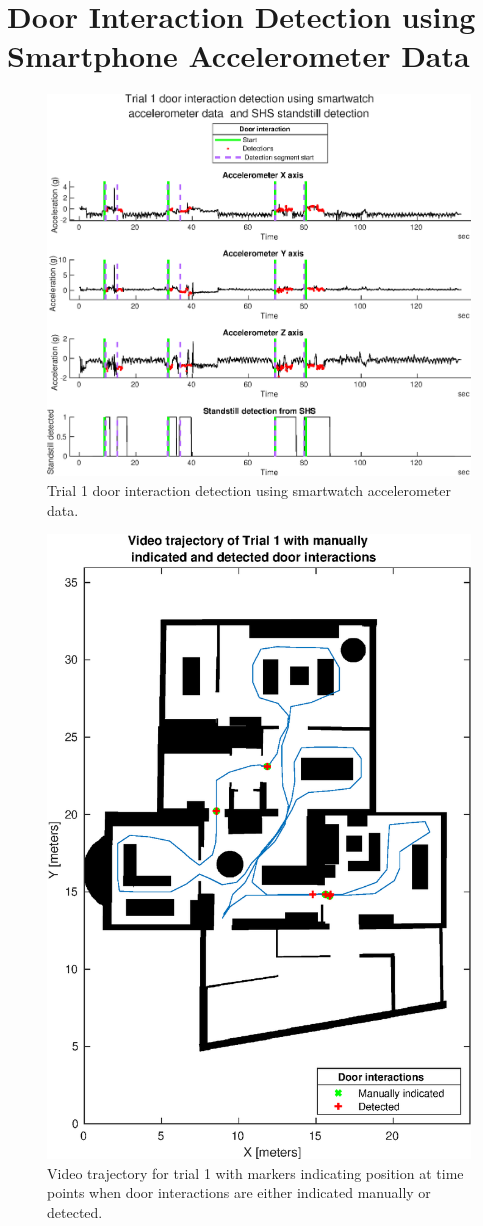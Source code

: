 \section{Door Interaction Detection using Smartphone Accelerometer Data}
\label{sec:app-door_interaction_detection}
\begin{figure}[H]
	\centering
	\includegraphics[width=0.8\linewidth]{images/20201201_1504_Trial_1_door_interaction_detection_using_smartwatch_1}
	\setlength{\belowcaptionskip}{-20pt}
	\caption{Trial 1 door interaction detection using smartwatch accelerometer data.}
	\label{fig:202011292139trial1doorinteractiondetectionusingsmartwatch1}
\end{figure}
\begin{figure}[H]
	\centering
	\includegraphics[width=0.7\linewidth]{images/20201129_2329_video_traj_Trial_1_door_detect_vs_manual_1}
	\setlength{\belowcaptionskip}{-20pt}
	\caption{Video trajectory for trial 1 with markers indicating position at time points when door interactions are either indicated manually or detected.}
	\label{fig:202011292329videotrajtrial1doordetectvsmanual1}
\end{figure}
